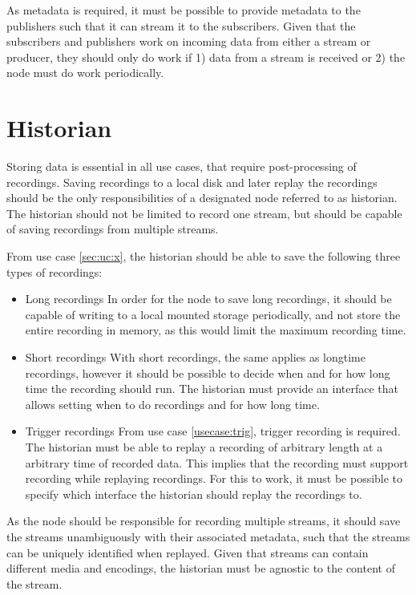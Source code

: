 
As metadata is required, it must be possible to provide metadata to the publishers such that it can stream it to the subscribers.
Given that the subscribers and publishers work on incoming data from either a stream or producer, they should only do work if 1) data from a stream is received or 2) the node must do work periodically.


\section{Historian}

Storing data is essential in all use cases, that require post-processing of recordings. Saving recordings to a local disk and later replay the recordings should be the only responsibilities of a designated node referred to as historian.
The historian should not be limited to record one stream, but should be capable of saving recordings from multiple streams. 

From use case \ref{sec:uc:x}, the historian should be able to save the following three types of recordings:
\begin{itemize}
	\item Long recordings
		In order for the node to save long recordings, it should be capable of writing to a local mounted storage periodically, and not store the entire recording in memory, as this would limit the maximum recording time.

	\item Short recordings
		With short recordings, the same applies as longtime recordings, however it should be possible to decide when and for how long time the recording should run. The historian must provide an interface that allows setting when to do recordings and for how long time.
	\item Trigger recordings
		From use case \ref{usecase:trig}, trigger recording is required. The historian must be able to replay a recording of arbitrary length at a arbitrary time of recorded data. This implies that the recording must support recording while replaying recordings. For this to work, it must be possible to specify which interface the historian should replay the recordings to.
\end{itemize}

As the node should be responsible for recording multiple streams, it should save the streams unambiguously with their associated metadata, such that the streams can be uniquely identified when replayed.
Given that streams can contain different media and encodings, the historian must be agnostic to the content of the stream.

